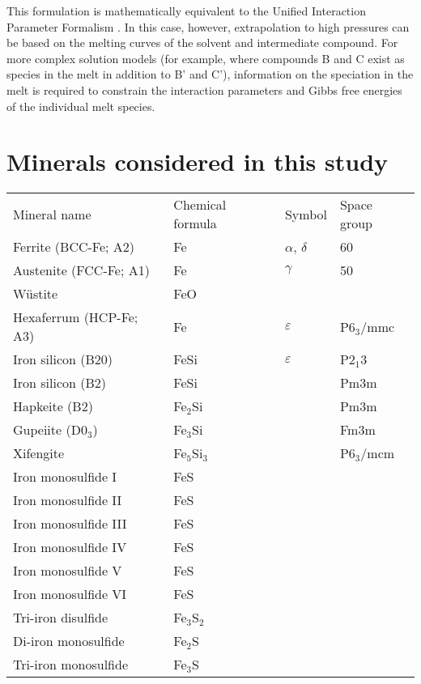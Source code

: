 \documentclass[11pt,a4paper,english]{article}
\begin{document}
\noindent This formulation is mathematically equivalent to the Unified Interaction Parameter Formalism \citep{BP1990}. In this case, however, extrapolation to high pressures can be based on the melting curves of the solvent and intermediate compound. For more complex solution models (for example, where compounds B and C exist as species in the melt in addition to B' and C'), information on the speciation in the melt is required to constrain the interaction parameters and Gibbs free energies of the individual melt species.

\section{Minerals considered in this study}
\begin{table}[h]
\begin{tabular}{llll}
  Mineral name        & Chemical formula & Symbol             & Space group \\
  Ferrite (BCC-Fe; A2)    & Fe               & $\alpha$, $\delta$ & 60          \\
  Austenite (FCC-Fe; A1)  & Fe               & $\gamma$           & 50          \\
  W\"ustite & FeO &   &  \\
  Hexaferrum (HCP-Fe; A3) & Fe               & $\varepsilon$      & P6$_3$/mmc  \\
  Iron silicon (B20)  & FeSi             & $\varepsilon$      & P2$_1$3     \\
  Iron silicon (B2)   & FeSi             &                    & Pm3m        \\
  Hapkeite (B2)       & Fe$_2$Si         &                    & Pm3m        \\
  Gupeiite (D0$_3$)   & Fe$_3$Si         &                    & Fm3m        \\
  Xifengite           & Fe$_5$Si$_3$     &                    & P6$_3$/mcm   \\
  Iron monosulfide I     &  FeS    &     &     \\
  Iron monosulfide II     &  FeS   &     &     \\
  Iron monosulfide III     &  FeS   &     &     \\
  Iron monosulfide IV     & FeS    &     &     \\
  Iron monosulfide V     &  FeS   &     &     \\
  Iron monosulfide VI     &  FeS   &     &     \\
  Tri-iron disulfide     &  Fe$_3$S$_2$   &     &     \\
  Di-iron monosulfide     & Fe$_2$S    &     &     \\
  Tri-iron monosulfide     & Fe$_3$S    &     &     \\
\end{tabular}
\end{table}
\end{document}
